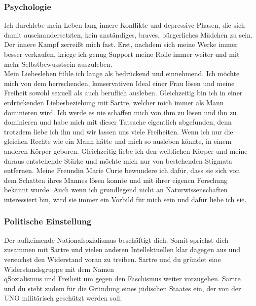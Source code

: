 \documentclass[12pt, a4paper, openany]{report}
\begin{document}
\subsubsection{Psychologie}

Ich durchlebe mein Leben lang innere Konflikte und depressive Phasen, die sich damit auseinandersetzten, kein anständiges, braves, bürgerliches Mädchen zu sein. Der innere Kampf zerreißt mich fast. Erst, nachdem sich meine Werke immer besser verkaufen, kriege ich genug Support meine Rolle immer weiter und mit mehr Selbstbewusstsein auszuleben. \\ 
Mein Liebesleben fühle ich lange als bedrückend und einnehmend. Ich möchte mich von dem  herrschenden, konservativen Ideal einer Frau lösen und meine Freiheit sowohl sexuell als auch beruflich ausleben. Gleichzeitig bin ich in einer erdrückenden Liebesbeziehung mit Sartre, welcher mich immer als Mann dominieren wird. Ich werde es nie schaffen mich von ihm zu lösen und ihn zu dominieren und habe mich mit dieser Tatsache eigentlich abgefunden, denn trotzdem liebe ich ihn und wir lassen uns viele Freiheiten.
Wenn ich nur die gleichen Rechte wie ein Mann hätte und mich so ausleben könnte, in einem anderen Körper geboren. Gleichzeitig liebe ich den weiblichen Körper und meine daraus entstehende Stärke und möchte mich nur von bestehenden Stigmata entfernen. Meine Freundin Marie Curie bewundere ich dafür, dass sie sich von dem Schatten ihres Mannes lösen konnte und mit ihrer eigenen Forschung bekannt wurde. Auch wenn ich grundlegend nicht an Naturwissenschaften interessiert bin, wird sie immer ein Vorbild für mich sein und dafür liebe ich sie. 



 
\subsubsection{Politische Einstellung} 

Der aufkeimende Nationalsozialismus beschäftigt dich. Somit sprichst dich zusammen mit Sartre und vielen anderen Intellektuellen klar dagegen aus und versuchst den Widerstand voran zu treiben. Sartre und du gründet eine Widerstandsgruppe mit dem Namen \\q{Sozialismus und Freiheit} um gegen den Faschismus weiter vorzugehen. Sartre und du steht zudem für die Gründung eines jüdischen Staates ein, der von der UNO militärisch geschützt werden soll. \\
\end{document}
